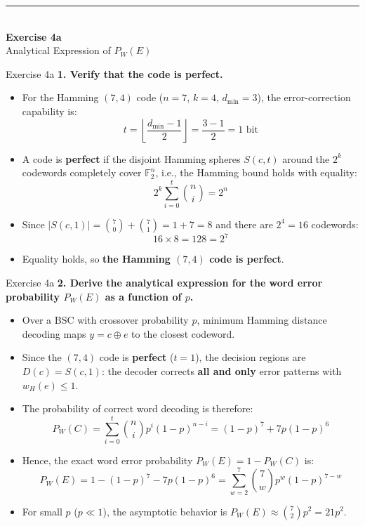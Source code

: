 \documentclass[10pt, aspectratio=169]{beamer}
\newcommand{\question}[1]{{\color{QuestionRed}\textbf{#1}}}
\begin{document}
\begin{frame}[plain]
  \vfill
  \centering
  {\color{TealAccent}\rule{2cm}{2pt}}\\[0.4cm]
  {\LARGE\bfseries\color{NavyPrimary} Exercise 4a}\\[0.2cm]
  {\large\color{SlateNeutral} Analytical Expression of $P_W(E)$}
  \vfill
\end{frame}

\begin{frame}{Exercise 4a}
  \question{1. Verify that the code is perfect.}

  \vspace{0.2cm}
  \begin{itemize}
    \item For the Hamming $(7,4)$ code ($n = 7$, $k = 4$, $d_{\min} = 3$), the error-correction capability is:
    \[
      t = \left\lfloor \frac{d_{\min} - 1}{2} \right\rfloor = \frac{3 - 1}{2} = 1\text{ bit}
    \]
    \item A code is \textbf{perfect} if the disjoint Hamming spheres $S(c, t)$ around the $2^k$ codewords completely cover $\mathbb{F}_2^n$, i.e., the Hamming bound holds with equality:
    \[
      2^k \sum_{i=0}^{t} \binom{n}{i} = 2^n
    \]
    \item Since $|S(c, 1)| = \binom{7}{0} + \binom{7}{1} = 1 + 7 = 8$ and there are $2^4 = 16$ codewords:
    \[
      16 \times 8 = 128 = 2^7
    \]
    \item Equality holds, so \textbf{the Hamming $(7,4)$ code is perfect}.
  \end{itemize}
\end{frame}

\begin{frame}{Exercise 4a}
  \question{2. Derive the analytical expression for the word error probability $P_W(E)$ as a function of $p$.}

  \vspace{0.2cm}
  \begin{itemize}
    \item Over a BSC with crossover probability $p$, minimum Hamming distance decoding maps $y = c \oplus e$ to the closest codeword.
    \item Since the $(7,4)$ code is \textbf{perfect} ($t = 1$), the decision regions are $D(c) = S(c, 1)$: the decoder corrects \textbf{all and only} error patterns with $w_H(e) \le 1$.
    \item The probability of correct word decoding is therefore:
    \[
      P_W(C) = \sum_{i=0}^{t} \binom{n}{i} p^i (1 - p)^{n - i} = (1 - p)^7 + 7p(1 - p)^6
    \]
    \item Hence, the exact word error probability $P_W(E) = 1 - P_W(C)$ is:
    \[
      P_W(E) = 1 - (1 - p)^7 - 7p(1 - p)^6 = \sum_{w=2}^{7} \binom{7}{w} p^w (1 - p)^{7 - w}
    \]
    \item For small $p$ ($p \ll 1$), the asymptotic behavior is $P_W(E) \approx \binom{7}{2} p^2 = 21p^2$.
  \end{itemize}
\end{frame}
\end{document}
